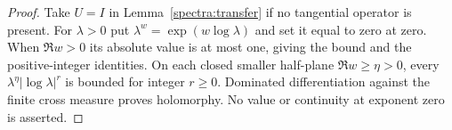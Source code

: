 \begin{proof}
Take $U=I$ in Lemma~\ref{spectra:transfer} if no tangential operator
is present.  For $\lambda>0$ put
$\lambda^w=\exp(w\log\lambda)$ and set it equal to zero at zero.
When $\Re w>0$ its absolute value is at most one, giving the bound
and the positive-integer identities.  On each closed smaller
half-plane $\Re w\ge\eta>0$, every
$\lambda^\eta|\log\lambda|^r$ is bounded for integer $r\ge0$.
Dominated differentiation against the finite cross measure proves
holomorphy.  No value or continuity at exponent zero is asserted.
\end{proof}
